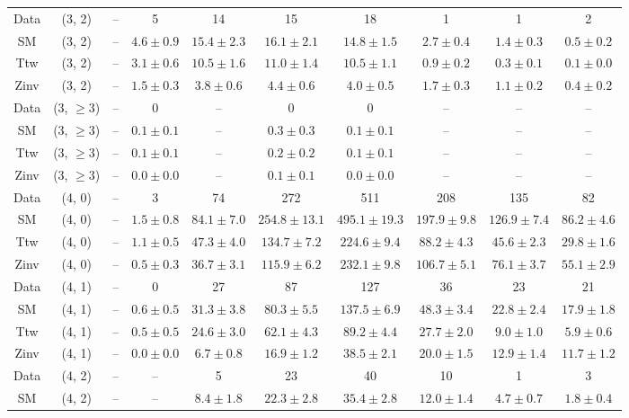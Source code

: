 \begin{table}[h!]
{\begin{tabular}{cccccccccc}
	Data & (3, 2) & -- & 5 & 14 & 15 & 18 & 1 & 1 & 2 \\[0.5ex] 
	SM & (3, 2) & -- & $4.6\pm 0.9$ & $15.4\pm 2.3$ & $16.1\pm 2.1$ & $14.8\pm 1.5$ & $2.7\pm 0.4$ & $1.4\pm 0.3$ & $0.5\pm 0.2$ \\[0.5ex] 
	Ttw & (3, 2) & -- & $3.1\pm 0.6$ & $10.5\pm 1.6$ & $11.0\pm 1.4$ & $10.5\pm 1.1$ & $0.9\pm 0.2$ & $0.3\pm 0.1$ & $0.1\pm 0.0$ \\[0.5ex] 
	Zinv & (3, 2) & -- & $1.5\pm 0.3$ & $3.8\pm 0.6$ & $4.4\pm 0.6$ & $4.0\pm 0.5$ & $1.7\pm 0.3$ & $1.1\pm 0.2$ & $0.4\pm 0.2$ \\[0.5ex] 
	Data & (3, $\ge3$) & -- & 0 & -- & 0 & 0 & -- & -- & -- \\[0.5ex] 
	SM & (3, $\ge3$) & -- & $0.1\pm 0.1$ & -- & $0.3\pm 0.3$ & $0.1\pm 0.1$ & -- & -- & -- \\[0.5ex] 
	Ttw & (3, $\ge3$) & -- & $0.1\pm 0.1$ & -- & $0.2\pm 0.2$ & $0.1\pm 0.1$ & -- & -- & -- \\[0.5ex] 
	Zinv & (3, $\ge3$) & -- & $0.0\pm 0.0$ & -- & $0.1\pm 0.1$ & $0.0\pm 0.0$ & -- & -- & -- \\[0.5ex] 
	Data & (4, 0) & -- & 3 & 74 & 272 & 511 & 208 & 135 & 82 \\[0.5ex] 
	SM & (4, 0) & -- & $1.5\pm 0.8$ & $84.1\pm 7.0$ & $254.8\pm 13.1$ & $495.1\pm 19.3$ & $197.9\pm 9.8$ & $126.9\pm 7.4$ & $86.2\pm 4.6$ \\[0.5ex] 
	Ttw & (4, 0) & -- & $1.1\pm 0.5$ & $47.3\pm 4.0$ & $134.7\pm 7.2$ & $224.6\pm 9.4$ & $88.2\pm 4.3$ & $45.6\pm 2.3$ & $29.8\pm 1.6$ \\[0.5ex] 
	Zinv & (4, 0) & -- & $0.5\pm 0.3$ & $36.7\pm 3.1$ & $115.9\pm 6.2$ & $232.1\pm 9.8$ & $106.7\pm 5.1$ & $76.1\pm 3.7$ & $55.1\pm 2.9$ \\[0.5ex] 
	Data & (4, 1) & -- & 0 & 27 & 87 & 127 & 36 & 23 & 21 \\[0.5ex] 
	SM & (4, 1) & -- & $0.6\pm 0.5$ & $31.3\pm 3.8$ & $80.3\pm 5.5$ & $137.5\pm 6.9$ & $48.3\pm 3.4$ & $22.8\pm 2.4$ & $17.9\pm 1.8$ \\[0.5ex] 
	Ttw & (4, 1) & -- & $0.5\pm 0.5$ & $24.6\pm 3.0$ & $62.1\pm 4.3$ & $89.2\pm 4.4$ & $27.7\pm 2.0$ & $9.0\pm 1.0$ & $5.9\pm 0.6$ \\[0.5ex] 
	Zinv & (4, 1) & -- & $0.0\pm 0.0$ & $6.7\pm 0.8$ & $16.9\pm 1.2$ & $38.5\pm 2.1$ & $20.0\pm 1.5$ & $12.9\pm 1.4$ & $11.7\pm 1.2$ \\[0.5ex] 
	Data & (4, 2) & -- & -- & 5 & 23 & 40 & 10 & 1 & 3 \\[0.5ex] 
	SM & (4, 2) & -- & -- & $8.4\pm 1.8$ & $22.3\pm 2.8$ & $35.4\pm 2.8$ & $12.0\pm 1.4$ & $4.7\pm 0.7$ & $1.8\pm 0.4$ \\[0.5ex] 

\end{tabular}}
\end{table}
